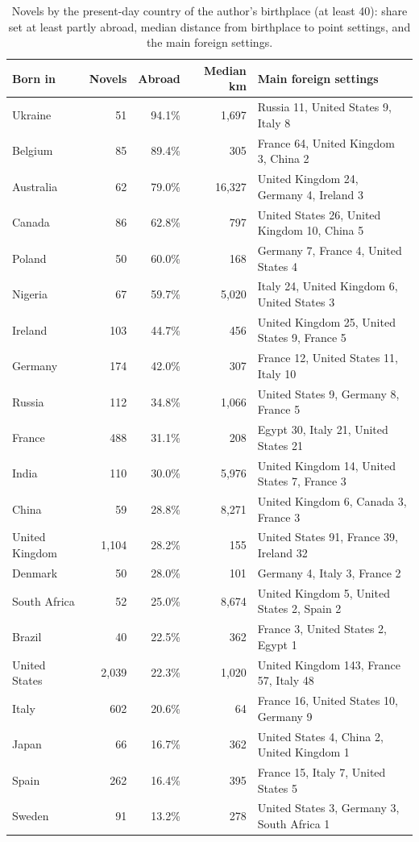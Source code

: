 \documentclass[11pt,a4paper]{article}
\begin{document}
\begin{table}[tbp]\centering\footnotesize\caption{Novels by the present-day country of the author's birthplace (at least 40): share set at least partly abroad, median distance from birthplace to point settings, and the main foreign settings.}\label{tab:home}\begin{tabular}{lrrrp{6cm}}\toprule Born in & Novels & Abroad & Median km & Main foreign settings\\\midrule
Ukraine & 51 & 94.1\% & 1,697 & Russia 11, United States 9, Italy 8\\
Belgium & 85 & 89.4\% & 305 & France 64, United Kingdom 3, China 2\\
Australia & 62 & 79.0\% & 16,327 & United Kingdom 24, Germany 4, Ireland 3\\
Canada & 86 & 62.8\% & 797 & United States 26, United Kingdom 10, China 5\\
Poland & 50 & 60.0\% & 168 & Germany 7, France 4, United States 4\\
Nigeria & 67 & 59.7\% & 5,020 & Italy 24, United Kingdom 6, United States 3\\
Ireland & 103 & 44.7\% & 456 & United Kingdom 25, United States 9, France 5\\
Germany & 174 & 42.0\% & 307 & France 12, United States 11, Italy 10\\
Russia & 112 & 34.8\% & 1,066 & United States 9, Germany 8, France 5\\
France & 488 & 31.1\% & 208 & Egypt 30, Italy 21, United States 21\\
India & 110 & 30.0\% & 5,976 & United Kingdom 14, United States 7, France 3\\
China & 59 & 28.8\% & 8,271 & United Kingdom 6, Canada 3, France 3\\
United Kingdom & 1,104 & 28.2\% & 155 & United States 91, France 39, Ireland 32\\
Denmark & 50 & 28.0\% & 101 & Germany 4, Italy 3, France 2\\
South Africa & 52 & 25.0\% & 8,674 & United Kingdom 5, United States 2, Spain 2\\
Brazil & 40 & 22.5\% & 362 & France 3, United States 2, Egypt 1\\
United States & 2,039 & 22.3\% & 1,020 & United Kingdom 143, France 57, Italy 48\\
Italy & 602 & 20.6\% & 64 & France 16, United States 10, Germany 9\\
Japan & 66 & 16.7\% & 362 & United States 4, China 2, United Kingdom 1\\
Spain & 262 & 16.4\% & 395 & France 15, Italy 7, United States 5\\
Sweden & 91 & 13.2\% & 278 & United States 3, Germany 3, South Africa 1\\
\bottomrule\end{tabular}\end{table}
\end{document}
